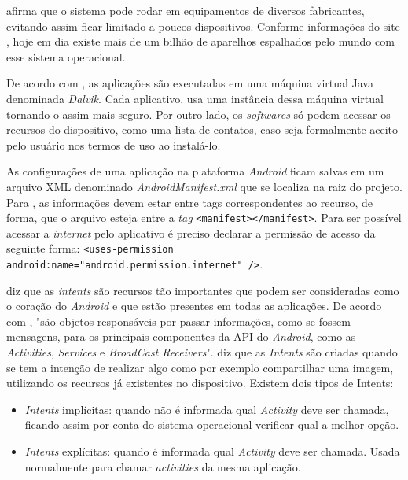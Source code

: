 	\par {} afirma que o sistema pode rodar em equipamentos
de diversos fabricantes, evitando assim ficar limitado a poucos dispositivos.
Conforme informações do site , hoje em dia existe mais de
um bilhão de aparelhos espalhados pelo mundo com esse sistema operacional.

	\par De acordo com , as aplicações são executadas em
uma máquina virtual Java denominada \textit{Dalvik}. Cada aplicativo, usa uma
instância dessa máquina virtual tornando-o assim mais seguro. Por outro lado, os
\textit{softwares} só podem acessar os recursos do dispositivo, como uma
lista de contatos, caso seja formalmente aceito pelo usuário nos termos de uso
ao instalá-lo.

	\par As configurações de uma aplicação na plataforma \textit{Android} ficam
salvas em um arquivo XML denominado \textit{AndroidManifest.xml} que se localiza
na raiz do projeto. Para , as informações devem estar
entre tags correspondentes ao recurso, de forma, que o arquivo esteja entre a
\textit{tag} \texttt{<manifest></manifest>}. Para ser possível acessar a
\textit{internet} pelo aplicativo é preciso declarar a permissão de acesso da
seguinte forma: \texttt{<uses-permission
android:name="android.permission.internet" />}.

	\par {} diz que as \textit{intents} são recursos tão
importantes que podem ser consideradas como o coração do \textit{Android} e que
estão presentes em todas as aplicações.	De acordo com
, "são objetos responsáveis por passar informações,
como se fossem mensagens, para os principais componentes da API do
\textit{Android}, como as \textit{Activities}, \textit{Services} e
\textit{BroadCast Receivers}".  diz que as
\textit{Intents} são criadas quando se tem a intenção de realizar algo como por
exemplo compartilhar uma imagem, utilizando os recursos já existentes no
dispositivo. Existem dois tipos de Intents:
	
	\begin{itemize}
	  
	  \item \textit{Intents} implícitas: quando não é informada qual
	  \textit{Activity} deve ser chamada, ficando assim por conta do sistema
	  operacional verificar qual a melhor opção.
	  
	  \item \textit{Intents} explícitas: quando é informada qual
	  \textit{Activity} deve ser chamada. Usada normalmente para chamar
	  \textit{activities} da mesma aplicação.
	  
	\end{itemize}
	
